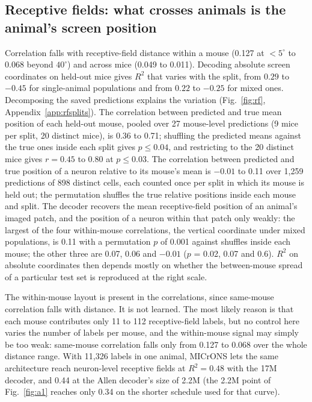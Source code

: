 \documentclass[11pt]{article}
\newcommand{\Rsq}{R^{2}}
\begin{document}
\subsection{Receptive fields: what crosses animals is the animal's screen position}\label{sec:rf}

Correlation falls with receptive-field distance within a mouse (0.127 at $<5^\circ$ to 0.068 beyond $40^\circ$) and across mice (0.049 to 0.011). Decoding absolute screen coordinates on held-out mice gives $\Rsq$ that varies with the split, from $0.29$ to $-0.45$ for single-animal populations and from $0.22$ to $-0.25$ for mixed ones. Decomposing the saved predictions explains the variation (Fig.~\ref{fig:rf}, Appendix~\ref{app:rfsplits}). The correlation between predicted and true mean position of each held-out mouse, pooled over 27 mouse-level predictions (9 mice per split, 20 distinct mice), is 0.36 to 0.71; shuffling the predicted means against the true ones inside each split gives $p \leq 0.04$, and restricting to the 20 distinct mice gives $r = 0.45$ to $0.80$ at $p \leq 0.03$. The correlation between predicted and true position of a neuron relative to its mouse's mean is $-0.01$ to 0.11 over 1,259 predictions of 898 distinct cells, each counted once per split in which its mouse is held out; the permutation shuffles the true relative positions inside each mouse and split. The decoder recovers the mean receptive-field position of an animal's imaged patch, and the position of a neuron within that patch only weakly: the largest of the four within-mouse correlations, the vertical coordinate under mixed populations, is 0.11 with a permutation $p$ of 0.001 against shuffles inside each mouse; the other three are 0.07, 0.06 and $-0.01$ ($p$ = 0.02, 0.07 and 0.6). $\Rsq$ on absolute coordinates then depends mostly on whether the between-mouse spread of a particular test set is reproduced at the right scale.

The within-mouse layout is present in the correlations, since same-mouse correlation falls with distance. It is not learned. The most likely reason is that each mouse contributes only 11 to 112 receptive-field labels, but no control here varies the number of labels per mouse, and the within-mouse signal may simply be too weak: same-mouse correlation falls only from 0.127 to 0.068 over the whole distance range. With 11,326 labels in one animal, MICrONS lets the same architecture reach neuron-level receptive fields at $\Rsq = 0.48$ with the 17M decoder, and 0.44 at the Allen decoder's size of 2.2M (the 2.2M point of Fig.~\ref{fig:a1} reaches only 0.34 on the shorter schedule used for that curve).
\end{document}
